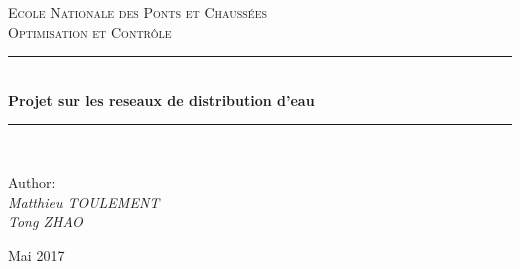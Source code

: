 \begin{titlepage}

\newcommand{\HRule}{\rule{\linewidth}{0.5mm}} %

\center %
 

\textsc{\LARGE Ecole Nationale des Ponts et Chaussées}\\[1.5cm] %
\textsc{\Large Optimisation et Contrôle}\\[0.5cm] %



\HRule \\[0.4cm]
{ \huge \bfseries Projet sur les reseaux de distribution d'eau}\\[0.4cm] %
\HRule \\[1.5cm]
 

\begin{center}

Author: \emph{\\ \vspace{0.8em} Matthieu TOULEMENT \\ Tong ZHAO}

\end{center}




{\large Mai 2017}\\[2cm] %


\end{titlepage}
